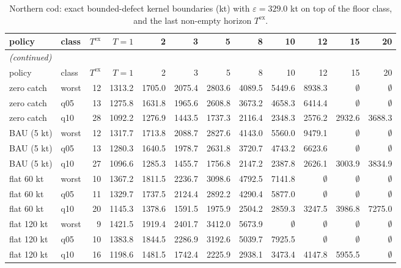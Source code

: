 \begingroup\scriptsize\setlength{\tabcolsep}{3pt}
\begin{longtable}{llrrrrrrrrrr}
\caption{Northern cod: exact bounded-defect kernel boundaries (kt) with $\varepsilon=329.0$ kt on top of the floor class, and the last non-empty horizon $T^{\mathrm{ex}}$.}\label{tab:si-cod-exact}\\
\toprule
policy & class & $T^{\mathrm{ex}}$ & $T{=}1$ & 2 & 3 & 5 & 8 & 10 & 12 & 15 & 20 \\
\midrule
\endfirsthead
\multicolumn{12}{l}{\emph{(continued)}}\\
\toprule
policy & class & $T^{\mathrm{ex}}$ & $T{=}1$ & 2 & 3 & 5 & 8 & 10 & 12 & 15 & 20 \\
\midrule
\endhead
\bottomrule
\endfoot
zero catch & worst & 12 & 1313.2 & 1705.0 & 2075.4 & 2803.6 & 4089.5 & 5449.6 & 8938.3 & $\emptyset$ & $\emptyset$ \\
zero catch & q05 & 13 & 1275.8 & 1631.8 & 1965.6 & 2608.8 & 3673.2 & 4658.3 & 6414.4 & $\emptyset$ & $\emptyset$ \\
zero catch & q10 & 28 & 1092.2 & 1276.9 & 1443.5 & 1737.3 & 2116.4 & 2348.3 & 2576.2 & 2932.6 & 3688.3 \\
BAU (5 kt) & worst & 12 & 1317.7 & 1713.8 & 2088.7 & 2827.6 & 4143.0 & 5560.0 & 9479.1 & $\emptyset$ & $\emptyset$ \\
BAU (5 kt) & q05 & 13 & 1280.3 & 1640.5 & 1978.7 & 2631.8 & 3720.7 & 4743.2 & 6623.6 & $\emptyset$ & $\emptyset$ \\
BAU (5 kt) & q10 & 27 & 1096.6 & 1285.3 & 1455.7 & 1756.8 & 2147.2 & 2387.8 & 2626.1 & 3003.9 & 3834.9 \\
flat 60 kt & worst & 10 & 1367.2 & 1811.5 & 2236.7 & 3098.6 & 4792.5 & 7141.8 & $\emptyset$ & $\emptyset$ & $\emptyset$ \\
flat 60 kt & q05 & 11 & 1329.7 & 1737.5 & 2124.4 & 2892.2 & 4290.4 & 5877.0 & $\emptyset$ & $\emptyset$ & $\emptyset$ \\
flat 60 kt & q10 & 20 & 1145.3 & 1378.6 & 1591.5 & 1975.9 & 2504.2 & 2859.3 & 3247.5 & 3986.8 & 7275.0 \\
flat 120 kt & worst & 9 & 1421.5 & 1919.4 & 2401.7 & 3412.0 & 5673.9 & $\emptyset$ & $\emptyset$ & $\emptyset$ & $\emptyset$ \\
flat 120 kt & q05 & 10 & 1383.8 & 1844.5 & 2286.9 & 3192.6 & 5039.7 & 7925.5 & $\emptyset$ & $\emptyset$ & $\emptyset$ \\
flat 120 kt & q10 & 16 & 1198.6 & 1481.5 & 1742.4 & 2225.9 & 2938.1 & 3473.4 & 4147.8 & 5955.5 & $\emptyset$ \\

\end{longtable}

